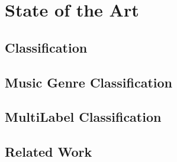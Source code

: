 
\chapter{State of the Art}

\label{stateofart}


\section{Classification}


\section{Music Genre Classification}


\section{MultiLabel Classification}


\section{Related Work}

